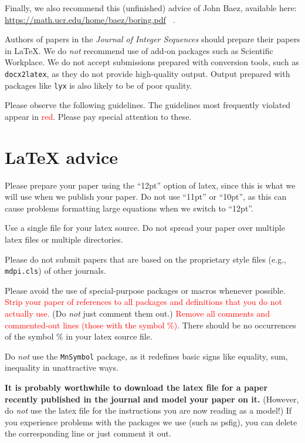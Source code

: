 \documentclass[12pt]{article}
\begin{document}
Finally, we also recommend this (unfinished) advice of John Baez,
available here: \\  \url{https://math.ucr.edu/home/baez/boring.pdf} \, .

     Authors of papers in the {\it Journal of Integer
Sequences} should prepare their papers in LaTeX.  We do {\it not\/}
recommend use of
add-on packages such as Scientific Workplace.  We do not accept submissions
prepared with conversion tools, such as {\tt docx2latex}, as they do not
provide high-quality output.   Output prepared with packages like {\tt lyx}
is also likely to be of poor quality.

Please observe the
following guidelines.
      The guidelines most frequently violated appear in
\textcolor{red}{red}.  Please pay special attention to these.


\section{LaTeX advice}

     Please prepare your paper using the ``12pt'' option of latex, since this
is what we will use when we publish your paper.  Do not use ``11pt''
or ``10pt'', as this can cause problems formatting large equations when
we switch to ``12pt''.

     Use a single file for your latex source.  Do not spread your paper
over multiple latex files or multiple directories.

     Please do not submit papers that are based on the
proprietary style files
(e.g., {\tt mdpi.cls}) of other journals.  

    Please avoid the use of special-purpose packages or
macros whenever possible.
\textcolor{red}{Strip
your paper of references to all packages and definitions that you
do not actually use.}  (Do {\it not\/} just comment them out.)
\textcolor{red}{Remove all comments and commented-out lines (those with the symbol \%).}  There should be no occurrences of the symbol \% in your 
latex source file.

Do {\it not\/} use the {\tt MnSymbol} package, as it redefines basic
signs like equality, sum, inequality in unattractive ways.

{\bf It is probably worthwhile to download the latex file for a paper recently
published in the journal and model your paper on it.}  (However,
do {\it not\/} use the latex file for the instructions you are now
reading as a model!)  If you experience problems with the packages
we use (such as psfig), you can delete the corresponding line or just
comment it out.
\end{document}
